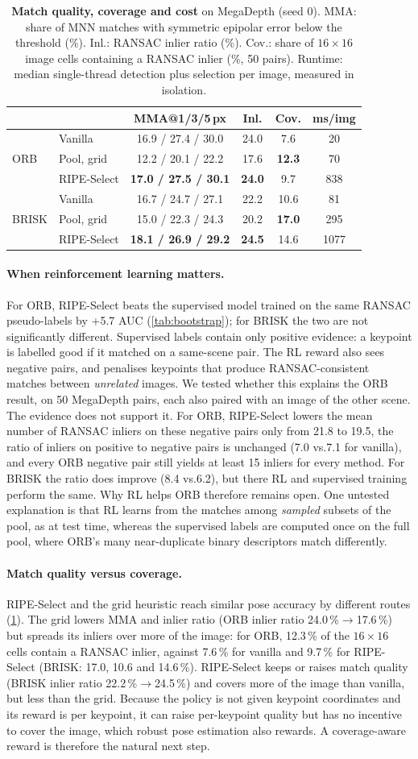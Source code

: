 \documentclass[10pt,twocolumn,letterpaper]{article}
\newcommand{\vs}{vs.}
\newcommand{\best}[1]{\textbf{#1}}
\newcommand{\COVov}{7.6}\newcommand{\COVog}{\best{12.3}}\newcommand{\COVor}{9.7}
\newcommand{\COVbv}{10.6}\newcommand{\COVbg}{\best{17.0}}\newcommand{\COVbr}{14.6}
\newcommand{\COVTEXT}{more of the image: for ORB, 12.3\,\% of the $16{\times}16$ cells contain a RANSAC
inlier, against 7.6\,\% for vanilla and 9.7\,\% for RIPE-Select (BRISK: 17.0, 10.6 and 14.6\,\%)}
\newcommand{\NEGTEXT}{We tested whether this explains the ORB result, on 50 MegaDepth pairs, each also
paired with an image of the other scene. The evidence does not support it. For ORB, RIPE-Select lowers
the mean number of RANSAC inliers on these negative pairs only from 21.8 to 19.5, the ratio of inliers
on positive to negative pairs is unchanged (7.0 \vs 7.1 for vanilla), and every ORB negative pair still
yields at least 15 inliers for every method. For BRISK the ratio does improve (8.4 \vs 6.2), but there
RL and supervised training perform the same. Why RL helps ORB therefore remains open. One untested
explanation is that RL learns from the matches among \emph{sampled} subsets of the pool, as at test
time, whereas the supervised labels are computed once on the full pool, where ORB's many
near-duplicate binary descriptors match differently.}
\begin{document}
\begin{table}[t]
  \centering\footnotesize
  \setlength\tabcolsep{3pt}
  \begin{tabular}{llcccc}
    \toprule
    & & MMA@1/3/5\,px & Inl. & Cov. & ms/img \\
    \midrule
    \multirow{3}{*}{ORB}   & Vanilla     & 16.9 / 27.4 / 30.0 & 24.0 & \COVov & 20 \\
                           & Pool, grid  & 12.2 / 20.1 / 22.2 & 17.6 & \COVog & 70 \\
                           & RIPE-Select & \best{17.0 / 27.5 / 30.1} & \best{24.0} & \COVor & 838 \\
    \midrule
    \multirow{3}{*}{BRISK} & Vanilla     & 16.7 / 24.7 / 27.1 & 22.2 & \COVbv & 81 \\
                           & Pool, grid  & 15.0 / 22.3 / 24.3 & 20.2 & \COVbg & 295 \\
                           & RIPE-Select & \best{18.1 / 26.9 / 29.2} & \best{24.5} & \COVbr & 1077 \\
    \bottomrule
  \end{tabular}
  \caption{\textbf{Match quality, coverage and cost} on MegaDepth (seed 0). MMA: share of MNN matches
  with symmetric epipolar error below the threshold (\%). Inl.: RANSAC inlier ratio (\%). Cov.: share of
  $16{\times}16$ image cells containing a RANSAC inlier (\%, 50 pairs). Runtime: median single-thread
  detection plus selection per image, measured in isolation.}
  \label{tab:matched}
\end{table}

\paragraph{When reinforcement learning matters.}
For ORB, RIPE-Select beats the supervised model trained on the same RANSAC pseudo-labels by +5.7 AUC
(\cref{tab:bootstrap}); for BRISK the two are not significantly different. Supervised labels contain
only positive evidence: a keypoint is labelled good if it matched on a same-scene pair. The RL reward
also sees negative pairs, and penalises keypoints that produce RANSAC-consistent matches between
\emph{unrelated} images. \NEGTEXT

\paragraph{Match quality versus coverage.}
RIPE-Select and the grid heuristic reach similar pose accuracy by different routes (\cref{tab:matched}).
The grid lowers MMA and inlier ratio (ORB inlier ratio 24.0\,\%$\to$17.6\,\%) but spreads its inliers
over \COVTEXT. RIPE-Select keeps or raises match quality (BRISK inlier ratio 22.2\,\%$\to$24.5\,\%) and
covers more of the image than vanilla, but less than the grid.
Because the policy is not given keypoint coordinates and its reward is per keypoint, it can raise
per-keypoint quality but has no incentive to cover the image, which robust pose estimation also
rewards. A coverage-aware reward is therefore the natural next step.
\end{document}
